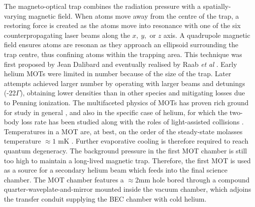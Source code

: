 	The magneto-optical trap combines the radiation pressure with a spatially-varying magnetic field. When atoms move away from the centre of the trap, a restoring force is created as the atoms move into resonance with one of the six counterpropagating laser beams along the $x,~y,$ or $z$ axis. A quadrupole magnetic field ensures atoms are resonan as they approach an ellipsoid surrounding the trap centre, thus confining atoms within the trapping area. This technique was first proposed by Jean Dalibard and eventually realised by Raab \emph{et al} \cite{raab87}. Early helium MOTs were limited in number because of the size of the trap. Later attempts achieved larger number by operating with larger beams and detunings (-22$\Gamma$), obtaining lower densities than in other species \cite{tol99} and mitigating losses due to Penning ionization. The multifaceted physics of MOTs has proven rich ground for study in general \cite{Townsend95,walker90}, and also in the specific case of helium, for which the two-body loss rate has been studied \cite{tol99} along with the roles of light-assisted collisions \cite{papers}. Temperatures in a MOT are, at best, on the order of the steady-state molasses temperature $\approx1$ mK \cite{Lett81}. Further evaporative cooling is therefore required to reach quantum degeneracy.
	The background pressure in the first MOT chamber is still too high to maintain a long-lived magnetic trap. Therefore, the first MOT is used as a source for a secondary helium beam which feeds into the final science chamber. The MOT chamber features a $\approx$2mm hole bored through a compound quarter-waveplate-and-mirror mounted inside the vacuum chamber, which adjoins the transfer conduit supplying the BEC chamber with cold helium. 

